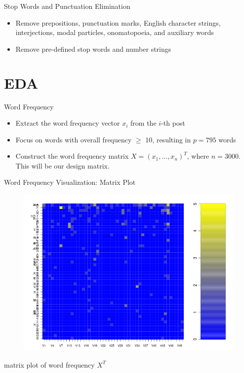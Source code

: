 \documentclass[12pt, trans]{beamer}
\newcommand{\1}[1]{{\mathbf 1}\left\{#1\right\}}        %
\begin{document}
\begin{frame}{Stop Words and Punctuation Elimination}

\begin{itemize}[<+->]
\item Remove prepositions, punctuation marks, English character strings, interjections, modal particles, onomatopoeia, and auxiliary words
\item Remove pre-defined stop words and number strings
\end{itemize}

\end{frame}



\section{EDA}


\begin{frame}{Word Frequency}
\begin{itemize}[<+->]
\item Extract the word frequency vector $x_i$ from the $i$-th post
\item Focus on words with overall frequency $\geq$ 10, resulting in $p=795$ words
\item Construct the word frequency matrix $X=(x_1,...,x_n)^T$, where $n=3000$. This will be our design matrix.
\end{itemize}
\end{frame}


\begin{frame}{Word Frequency Visualization: Matrix Plot}

\begin{figure}
  \centering
  \includegraphics[height=0.9\textheight]{./../../wordFreqMat.png} 
\end{figure}
\center matrix plot of word frequency $X^T$

\end{frame}
\end{document}

